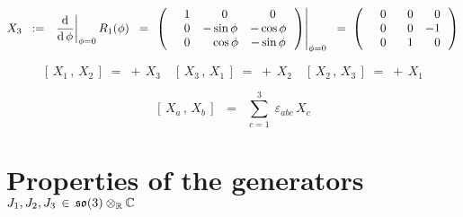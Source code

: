 \begin{equation*}
X_{3}
\;\; := \;\;
	\left.\dfrac{\d}{\d\,\phi}\right\vert_{\phi = 0} R_{1}(\phi)
\;\; = \;
	\left.\left(\,
		\begin{array}{ccc}
			{\color{white}-}1 & {\color{white}-}0 & {\color{white}-}0 \\
			{\color{white}-}0 & {\color{black}-}\sin\phi & {\color{black}-}\cos\phi \\
			{\color{white}-}0 & {\color{white}-}\cos\phi & {\color{black}-}\sin\phi \\
			\end{array}
		\,\right)\right\vert_{\phi = 0}
\;\; = \;
	\left(\,
		\begin{array}{ccc}
			{\color{white}-}0 & {\color{white}-}0 & {\color{white}-}0 \\
			{\color{white}-}0 & {\color{white}-}0 & {\color{black}-}1 \\
			{\color{white}-}0 & {\color{white}-}1 & {\color{white}-}0 \\
			\end{array}
		\,\right)
\end{equation*}

\vskip 0.5cm
\begin{equation*}
\left[\,X_{1}\,,\,X_{2}\,\right] \;=\; +\,X_{3}
\quad
\left[\,X_{3}\,,\,X_{1}\,\right] \;=\; +\,X_{2}
\quad
\left[\,X_{2}\,,\,X_{3}\,\right] \;=\; +\,X_{1}
\end{equation*}

\vskip 0.5cm
\begin{equation*}
\left[\,X_{a}\,,\,X_{b}\,\right] \;\;=\;\; \overset{3}{\underset{c=1}{\sum}}\;\varepsilon_{abc}\,X_{c}
\end{equation*}


\vskip 0.5cm
\section{Properties of the generators \,$J_{1}, J_{2}, J_{3} \,\in\, \mathfrak{so}(3) \otimes_{\mathbb{R}} \mathbb{C}$}



